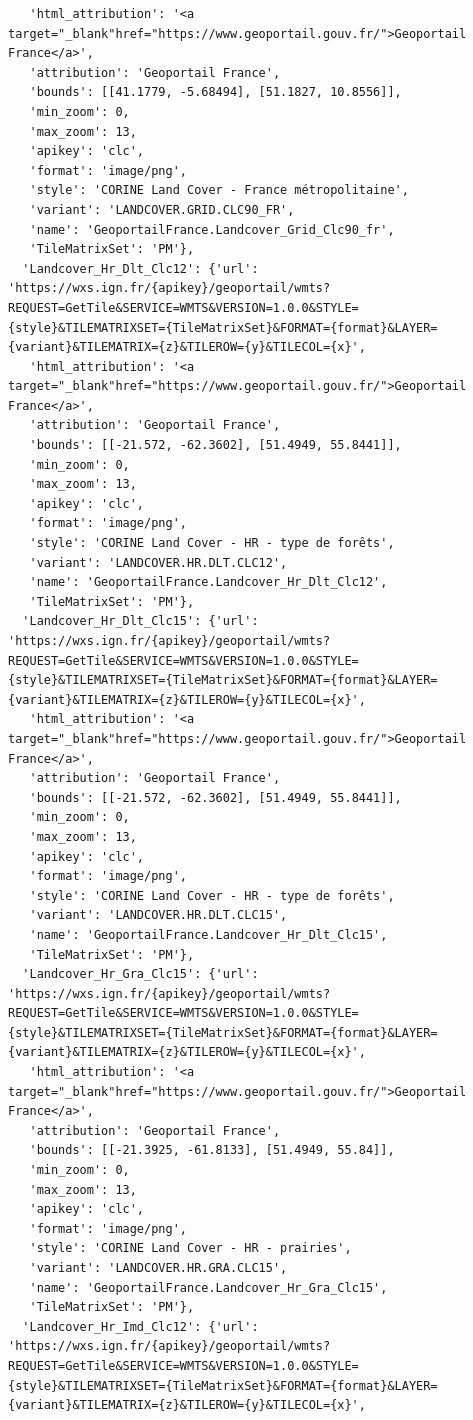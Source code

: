 \documentclass[
  letterpaper,
  DIV=11,
  numbers=noendperiod]{scrreprt}
\begin{document}
\begin{verbatim}
   'html_attribution': '<a target="_blank"href="https://www.geoportail.gouv.fr/">Geoportail France</a>',
   'attribution': 'Geoportail France',
   'bounds': [[41.1779, -5.68494], [51.1827, 10.8556]],
   'min_zoom': 0,
   'max_zoom': 13,
   'apikey': 'clc',
   'format': 'image/png',
   'style': 'CORINE Land Cover - France métropolitaine',
   'variant': 'LANDCOVER.GRID.CLC90_FR',
   'name': 'GeoportailFrance.Landcover_Grid_Clc90_fr',
   'TileMatrixSet': 'PM'},
  'Landcover_Hr_Dlt_Clc12': {'url': 'https://wxs.ign.fr/{apikey}/geoportail/wmts?REQUEST=GetTile&SERVICE=WMTS&VERSION=1.0.0&STYLE={style}&TILEMATRIXSET={TileMatrixSet}&FORMAT={format}&LAYER={variant}&TILEMATRIX={z}&TILEROW={y}&TILECOL={x}',
   'html_attribution': '<a target="_blank"href="https://www.geoportail.gouv.fr/">Geoportail France</a>',
   'attribution': 'Geoportail France',
   'bounds': [[-21.572, -62.3602], [51.4949, 55.8441]],
   'min_zoom': 0,
   'max_zoom': 13,
   'apikey': 'clc',
   'format': 'image/png',
   'style': 'CORINE Land Cover - HR - type de forêts',
   'variant': 'LANDCOVER.HR.DLT.CLC12',
   'name': 'GeoportailFrance.Landcover_Hr_Dlt_Clc12',
   'TileMatrixSet': 'PM'},
  'Landcover_Hr_Dlt_Clc15': {'url': 'https://wxs.ign.fr/{apikey}/geoportail/wmts?REQUEST=GetTile&SERVICE=WMTS&VERSION=1.0.0&STYLE={style}&TILEMATRIXSET={TileMatrixSet}&FORMAT={format}&LAYER={variant}&TILEMATRIX={z}&TILEROW={y}&TILECOL={x}',
   'html_attribution': '<a target="_blank"href="https://www.geoportail.gouv.fr/">Geoportail France</a>',
   'attribution': 'Geoportail France',
   'bounds': [[-21.572, -62.3602], [51.4949, 55.8441]],
   'min_zoom': 0,
   'max_zoom': 13,
   'apikey': 'clc',
   'format': 'image/png',
   'style': 'CORINE Land Cover - HR - type de forêts',
   'variant': 'LANDCOVER.HR.DLT.CLC15',
   'name': 'GeoportailFrance.Landcover_Hr_Dlt_Clc15',
   'TileMatrixSet': 'PM'},
  'Landcover_Hr_Gra_Clc15': {'url': 'https://wxs.ign.fr/{apikey}/geoportail/wmts?REQUEST=GetTile&SERVICE=WMTS&VERSION=1.0.0&STYLE={style}&TILEMATRIXSET={TileMatrixSet}&FORMAT={format}&LAYER={variant}&TILEMATRIX={z}&TILEROW={y}&TILECOL={x}',
   'html_attribution': '<a target="_blank"href="https://www.geoportail.gouv.fr/">Geoportail France</a>',
   'attribution': 'Geoportail France',
   'bounds': [[-21.3925, -61.8133], [51.4949, 55.84]],
   'min_zoom': 0,
   'max_zoom': 13,
   'apikey': 'clc',
   'format': 'image/png',
   'style': 'CORINE Land Cover - HR - prairies',
   'variant': 'LANDCOVER.HR.GRA.CLC15',
   'name': 'GeoportailFrance.Landcover_Hr_Gra_Clc15',
   'TileMatrixSet': 'PM'},
  'Landcover_Hr_Imd_Clc12': {'url': 'https://wxs.ign.fr/{apikey}/geoportail/wmts?REQUEST=GetTile&SERVICE=WMTS&VERSION=1.0.0&STYLE={style}&TILEMATRIXSET={TileMatrixSet}&FORMAT={format}&LAYER={variant}&TILEMATRIX={z}&TILEROW={y}&TILECOL={x}',

\end{verbatim}
\end{document}
